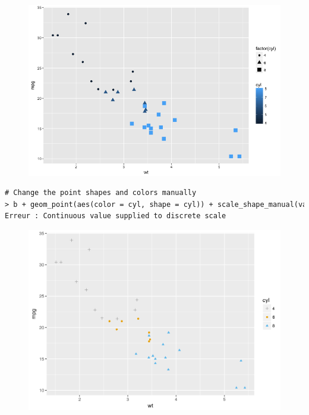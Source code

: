 \begin{figure}[H]\begin{center}\includegraphics[scale=1 ]{ilu/bg41.png}\end{center}\end{figure}
\begin{lstlisting}[language=html]
# Change the point shapes and colors manually
> b + geom_point(aes(color = cyl, shape = cyl)) + scale_shape_manual(values = c(3,16,17)) + scale_color_manual(values = c('#999999','#E69F00', '#56B4E9'))
Erreur : Continuous value supplied to discrete scale
\end{lstlisting}
\begin{figure}[H]\begin{center}\includegraphics[scale=1 ]{ilu/bg42.png}\end{center}\end{figure}
